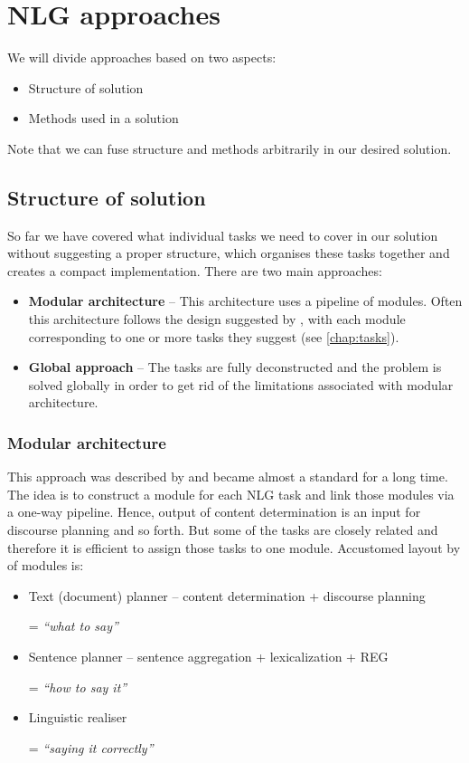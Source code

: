 \chapter{NLG approaches}\label{chap:approaches}
We will divide approaches based on two aspects:
\begin{itemize}
	\item Structure of solution
	\item Methods used in a solution
\end{itemize}	

Note that we can fuse structure and methods arbitrarily in our desired solution. 

\section{Structure of solution}
So far we have covered what individual tasks we need to cover in our solution without suggesting a proper structure, which organises these tasks together and creates a compact implementation. There are two main approaches:
\begin{itemize}
	\item \textbf{Modular architecture} -- This architecture uses a pipeline of modules. Often this architecture follows the design suggested by \cite{reiter1997building}, with each module corresponding to one or more tasks they suggest (see \ref{chap:tasks}). 
	\item \textbf{Global approach} -- The tasks are fully deconstructed and the problem is solved globally in order to get rid of the limitations associated with modular architecture. 
\end{itemize}

\subsection{Modular architecture}\label{section:modules}
This approach was described by \cite{reiter1997building} and became almost a standard for a long time. The idea is to construct a module for each NLG task and link those modules via a one-way pipeline. Hence, output of content determination is an input for discourse planning and so forth. But some of the tasks are closely related and therefore it is efficient to assign those tasks to one module. Accustomed layout by \cite{reiter1997building} of modules is: 
\begin{itemize}
	\item Text (document) planner -- content determination + discourse planning
	
	= \emph{``what to say”}
	\item Sentence planner -- sentence aggregation + lexicalization + REG
	
	= \emph{``how to say it”}
	\item Linguistic realiser
	
	= \emph{``saying it correctly”}
\end{itemize}


